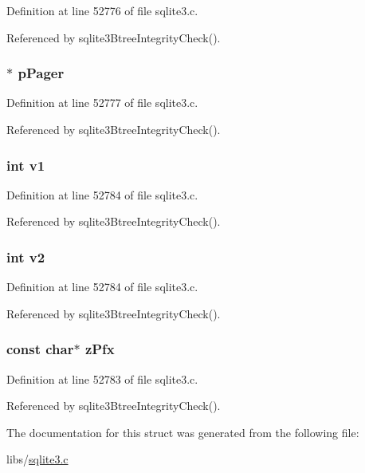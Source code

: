 Definition at line 52776 of file sqlite3.\+c.



Referenced by sqlite3\+Btree\+Integrity\+Check().

\hypertarget{struct_integrity_ck_a916447fa61ba4e11cc93d571a66d3aaf}{}
\subsubsection[{p\+Pager}]{$\ast$ p\+Pager}\label{struct_integrity_ck_a916447fa61ba4e11cc93d571a66d3aaf}


Definition at line 52777 of file sqlite3.\+c.



Referenced by sqlite3\+Btree\+Integrity\+Check().

\hypertarget{struct_integrity_ck_ac3f9ff4294615df8b7e9684b7d6fddc7}{}
\subsubsection[{v1}]{\setlength{\rightskip}{0pt plus 5cm}int v1}\label{struct_integrity_ck_ac3f9ff4294615df8b7e9684b7d6fddc7}


Definition at line 52784 of file sqlite3.\+c.



Referenced by sqlite3\+Btree\+Integrity\+Check().

\hypertarget{struct_integrity_ck_aa517e2fff4a8c9cba11391ca12f91803}{}
\subsubsection[{v2}]{\setlength{\rightskip}{0pt plus 5cm}int v2}\label{struct_integrity_ck_aa517e2fff4a8c9cba11391ca12f91803}


Definition at line 52784 of file sqlite3.\+c.



Referenced by sqlite3\+Btree\+Integrity\+Check().

\hypertarget{struct_integrity_ck_acddf8038b96fe7c847581661451d4667}{}
\subsubsection[{z\+Pfx}]{\setlength{\rightskip}{0pt plus 5cm}const char$\ast$ z\+Pfx}\label{struct_integrity_ck_acddf8038b96fe7c847581661451d4667}


Definition at line 52783 of file sqlite3.\+c.



Referenced by sqlite3\+Btree\+Integrity\+Check().



The documentation for this struct was generated from the following file\+:\begin{DoxyCompactItemize}
\item 
libs/\hyperlink{sqlite3_8c}{sqlite3.\+c}\end{DoxyCompactItemize}
